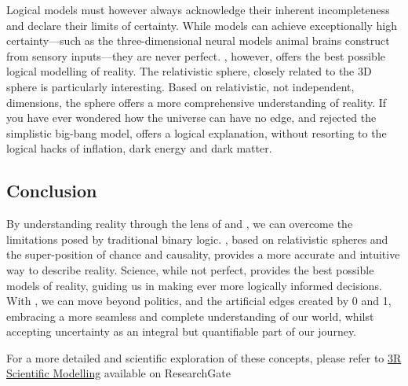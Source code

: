 \documentclass{article}
\begin{document}
Logical models must however always acknowledge their inherent incompleteness and declare their limits of certainty. While models can achieve exceptionally high certainty—such as the three-dimensional neural models animal brains construct from sensory inputs—they are never perfect. \iR{}, however, offers the best possible logical modelling of reality. The relativistic \iR{} sphere, closely related to the 3D sphere is particularly interesting. Based on relativistic, not independent, dimensions, the \iR{} sphere offers a more comprehensive understanding of reality. If you have ever wondered how the universe can have no edge, and rejected the simplistic big-bang model, \iR{} offers a logical explanation, without resorting to the logical hacks of inflation, dark energy and dark matter.

\subsection*{Conclusion}

By understanding reality through the lens of \iR{} and \qbit{}, we can overcome the limitations posed by traditional binary logic. \iR{}, based on relativistic spheres and the super-position of chance and causality, provides a more accurate and intuitive way to describe reality. Science, while not perfect, provides the best possible models of reality, guiding us in making ever more logically informed decisions. With \iR{}, we can move beyond politics, and the artificial edges created by 0 and 1, embracing a more seamless and complete understanding of our world, whilst accepting uncertainty as an integral but quantifiable part of our journey.

For a more detailed and scientific exploration of these concepts, please refer to \href{https://www.researchgate.net/publication/379035220_3R_Scientific_Modelling}{3R Scientific Modelling} available on ResearchGate
\end{document}
